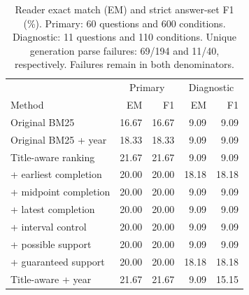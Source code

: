 \begin{table}[t]
\centering\footnotesize
\setlength{\tabcolsep}{3pt}
\begin{tabular}{@{}lrrrr@{}}
\toprule
 & \multicolumn{2}{c}{Primary} & \multicolumn{2}{c}{Diagnostic}\\
Method & EM & F1 & EM & F1\\
\midrule
Original BM25 & 16.67 & 16.67 & 9.09 & 9.09\\
Original BM25 + year & 18.33 & 18.33 & 9.09 & 9.09\\
Title-aware ranking & 21.67 & 21.67 & 9.09 & 9.09\\
\quad + earliest completion & 20.00 & 20.00 & 18.18 & 18.18\\
\quad + midpoint completion & 20.00 & 20.00 & 9.09 & 9.09\\
\quad + latest completion & 20.00 & 20.00 & 9.09 & 9.09\\
\quad + interval control & 20.00 & 20.00 & 9.09 & 9.09\\
\quad + possible support & 20.00 & 20.00 & 9.09 & 9.09\\
\quad + guaranteed support & 20.00 & 20.00 & 18.18 & 18.18\\
Title-aware + year & 21.67 & 21.67 & 9.09 & 15.15\\
\bottomrule
\end{tabular}
\caption{Reader exact match (EM) and strict answer-set F1 (\%). Primary: 60 questions and 600 conditions. Diagnostic: 11 questions and 110 conditions. Unique generation parse failures: 69/194 and 11/40, respectively. Failures remain in both denominators.}
\label{tab:reader}
\end{table}
